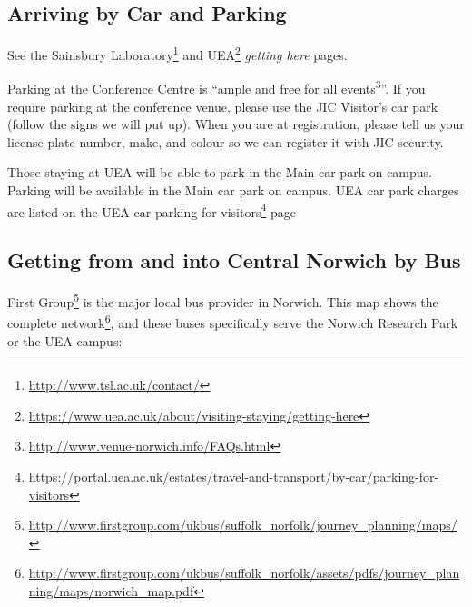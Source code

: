 \documentclass[12pt,]{book}
\let\rmarkdownfootnote\footnote%
\def\footnote{\protect\rmarkdownfootnote}
\renewcommand{\href}[2]{#2\footnote{\url{#1}}}
\theoremstyle{definition}
\theoremstyle{definition}
\theoremstyle{remark}
\begin{document}
\subsection*{Arriving by Car and
Parking}\label{arriving-by-car-and-parking}

See the \href{http://www.tsl.ac.uk/contact/}{Sainsbury Laboratory} and
\href{https://www.uea.ac.uk/about/visiting-staying/getting-here}{UEA}
\emph{getting here} pages.

Parking at the Conference Centre is
``\href{http://www.venue-norwich.info/FAQs.html}{ample and free for all
events}''. If you require parking at the conference venue, please use
the JIC Visitor's car park (follow the signs we will put up). When you
are at registration, please tell us your license plate number, make, and
colour so we can register it with JIC security.

Those staying at UEA will be able to park in the Main car park on
campus. Parking will be available in the Main car park on campus. UEA
car park charges are listed on the
\href{https://portal.uea.ac.uk/estates/travel-and-transport/by-car/parking-for-visitors}{UEA
car parking for visitors} page

\subsection*{Getting from and into Central Norwich by
Bus}\label{getting-from-and-into-central-norwich-by-bus}

\href{http://www.firstgroup.com/ukbus/suffolk_norfolk/journey_planning/maps/}{First
Group} is the major local bus provider in Norwich.
\href{http://www.firstgroup.com/ukbus/suffolk_norfolk/assets/pdfs/journey_planning/maps/norwich_map.pdf}{This
map shows the complete network}, and these buses specifically serve the
Norwich Research Park or the UEA campus:
\end{document}
